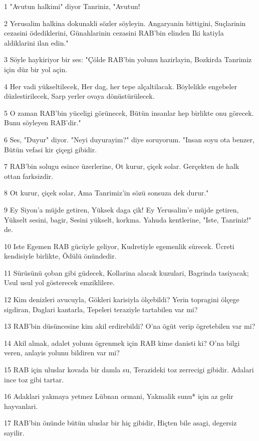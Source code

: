 \par 1 "Avutun halkimi" diyor Tanriniz, "Avutun!
\par 2 Yerusalim halkina dokunakli sözler söyleyin. Angaryanin bittigini, Suçlarinin cezasini ödediklerini, Günahlarinin cezasini RAB'bin elinden Iki katiyla aldiklarini ilan edin."
\par 3 Söyle haykiriyor bir ses: "Çölde RAB'bin yolunu hazirlayin, Bozkirda Tanrimiz için düz bir yol açin.
\par 4 Her vadi yükseltilecek, Her dag, her tepe alçaltilacak. Böylelikle engebeler düzlestirilecek, Sarp yerler ovaya dönüstürülecek.
\par 5 O zaman RAB'bin yüceligi görünecek, Bütün insanlar hep birlikte onu görecek. Bunu söyleyen RAB'dir."
\par 6 Ses, "Duyur" diyor. "Neyi duyurayim?" diye soruyorum. "Insan soyu ota benzer, Bütün vefasi kir çiçegi gibidir.
\par 7 RAB'bin solugu esince üzerlerine, Ot kurur, çiçek solar. Gerçekten de halk ottan farksizdir.
\par 8 Ot kurur, çiçek solar, Ama Tanrimiz'in sözü sonsuza dek durur."
\par 9 Ey Siyon'a müjde getiren, Yüksek daga çik! Ey Yerusalim'e müjde getiren, Yükselt sesini, bagir, Sesini yükselt, korkma. Yahuda kentlerine, "Iste, Tanriniz!" de.
\par 10 Iste Egemen RAB gücüyle geliyor, Kudretiyle egemenlik sürecek. Ücreti kendisiyle birlikte, Ödülü önündedir.
\par 11 Sürüsünü çoban gibi güdecek, Kollarina alacak kuzulari, Bagrinda tasiyacak; Usul usul yol gösterecek emziklilere.
\par 12 Kim denizleri avucuyla, Gökleri karisiyla ölçebildi? Yerin topragini ölçege sigdiran, Daglari kantarla, Tepeleri teraziyle tartabilen var mi?
\par 13 RAB'bin düsüncesine kim akil erdirebildi? O'na ögüt verip ögretebilen var mi?
\par 14 Akil almak, adalet yolunu ögrenmek için RAB kime danisti ki? O'na bilgi veren, anlayis yolunu bildiren var mi?
\par 15 RAB için uluslar kovada bir damla su, Terazideki toz zerrecigi gibidir. Adalari ince toz gibi tartar.
\par 16 Adaklari yakmaya yetmez Lübnan ormani, Yakmalik sunu* için az gelir hayvanlari.
\par 17 RAB'bin önünde bütün uluslar bir hiç gibidir, Hiçten bile asagi, degersiz sayilir.

